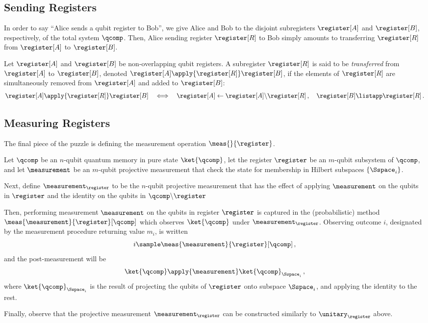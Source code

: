   \subsection{Sending Registers}\label{subsec:sending}
    In order to say ``Alice sends a qubit register to Bob'', we 
      give Alice and Bob to the disjoint subregisters
      $\register[A]$ and $\register[B]$, respectively, 
      of the total system $\qcomp$. 
      Then, Alice sending register $\register[R]$ to Bob simply amounts to
      transferring $\register[R]$ from $\register[A]$ to $\register[B]$.

    \begin{definition}
      Let $\register[A]$ and $\register[B]$ be non-overlapping qubit registers. A
      subregister $\register[R]$ is said to be \emph{transferred} from
      $\register[A]$ to $\register[B]$, denoted $\register[A]
      \apply{\register[R]} \register[B]$, if the elements of $\register[R]$ are
      simultaneously removed from $\register[A]$ and added to $\register[B]$:
      \[
        \register[A] \apply{\register[R]} \register[B]
        \quad \Longleftrightarrow \quad 
        \register[A] \gets \register[A] \backslash \register[R]\, , \quad \register[B] \listapp \register[R]\, .
      \]
    \end{definition}

  \subsection{Measuring Registers}
    The final piece of the puzzle is defining the measurement operation
      $\meas{}{\register}$.

    \begin{definition}
      Let $\qcomp$ be an $n$-qubit quantum memory in pure state
        $\ket{\qcomp}$, let the register $\register$ be an $m$-qubit
        subsystem of $\qcomp$, and let $\measurement$ be an $m$-qubit
        projective measurement that check the state for membership in
        Hilbert subspaces $\{ \Sspace_i \}$.

      Next, define $\measurement_{\register}$ to be the $n$-qubit
        projective measurement that
        has the effect of applying $\measurement$ on the qubits in $\register$ and the
        identity on the qubits in $\qcomp \backslash \register$

      Then, performing measurement $\measurement$ on the qubits in register
        $\register$ is captured in the (probabilistic) method
        $\meas{\measurement}{\register}[\qcomp]$ which observes
        $\ket{\qcomp}$ under $\measurement_{\register}$. Observing outcome
        $i$, designated by the measurement procedure returning value $m_i$,
        is written
      \[
        i \sample \meas{\measurement}{\register}[\qcomp]\, ,
      \]
        and the post-measurement will be 
      \[
        \ket{\qcomp} \apply{\measurement} \ket{\qcomp}_{\Sspace_i}\, ,
      \]
      where $\ket{\qcomp}_{\Sspace_i}$ is the result of projecting the
        qubits of $\register$ onto subspace $\Sspace_i$, and applying the
        identity to the rest.
    \end{definition}

    \noindent
    Finally, observe that the projective measurement $\measurement_{\register}$ can be
      constructed similarly to $\unitary_{\register}$ above.
